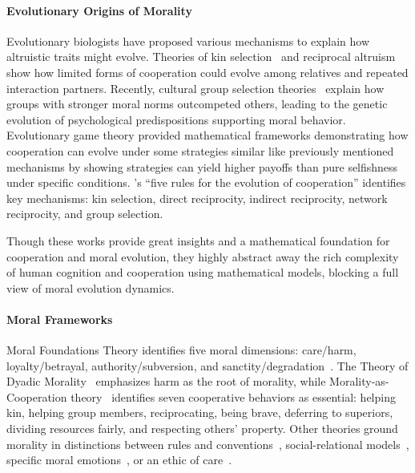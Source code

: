 \paragraph{Evolutionary Origins of Morality}

Evolutionary biologists have proposed various mechanisms to explain how altruistic traits might evolve. Theories of kin selection~\citep{hamilton1964genetical} and reciprocal altruism~\citep{trivers1971evolution} show how limited forms of cooperation could evolve among relatives and repeated interaction partners. Recently, cultural group selection theories~\citep{boyd2011cultural, henrich2015secret} explain how groups with stronger moral norms outcompeted others, leading to the genetic evolution of psychological predispositions supporting moral behavior.
Evolutionary game theory provided mathematical frameworks demonstrating how cooperation can evolve under some strategies similar like previously mentioned mechanisms by showing strategies can yield higher payoffs than pure selfishness under specific conditions. \citet{nowak2006five}'s ``five rules for the evolution of cooperation'' identifies key mechanisms: kin selection, direct reciprocity, indirect reciprocity, network reciprocity, and group selection. 

Though these works provide great insights and a mathematical foundation for cooperation and moral evolution, they highly abstract away the rich complexity of human cognition and cooperation using mathematical models, blocking a full view of moral evolution dynamics.

\paragraph{Moral Frameworks}

Moral Foundations Theory identifies five moral dimensions: care/harm, loyalty/betrayal, authority/subversion, and sanctity/degradation~\citep{Haidt2007MFT}. The Theory of Dyadic Morality~\citep{Gray2012TDM} emphasizes harm as the root of morality, while Morality-as-Cooperation theory~\citep{Curry2019MAC} identifies seven cooperative behaviors as essential: helping kin, helping group members, reciprocating, being brave, deferring to superiors, dividing resources fairly, and respecting others' property. Other theories ground morality in distinctions between rules and conventions~\citep{Turiel1983MDT}, social-relational models~\citep{Fiske1992RMT, Rai2011RRT}, specific moral emotions~\citep{Rozin1999CAD}, or an ethic of care~\citep{Gilligan1982EOC}.


